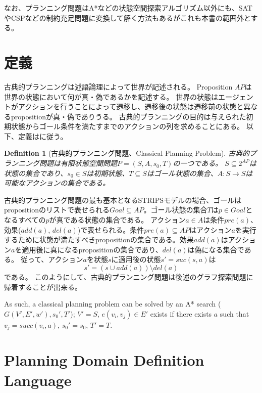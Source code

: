 \documentclass[b5paper]{report}
\newtheorem{definition}{Definition}
\begin{document}
なお、プランニング問題はA*などの状態空間探索アルゴリズム以外にも、SATやCSPなどの制約充足問題に変換して解く方法もあるがこれも本書の範囲外とする\cite{kautz:92}。

\section{定義}
\label{sec:planning-definition}


古典的プランニングは述語論理によって世界が記述される\cite{fikes:71}。
Proposition $AP$は世界の状態において何が真・偽であるかを記述する。
世界の状態はエージェントがアクションを行うことによって遷移し、遷移後の状態は遷移前の状態と異なるpropositionが真・偽でありうる。
古典的プランニングの目的は与えられた初期状態からゴール条件を満たすまでのアクションの列を求めることにある。
以下、定義は\cite{edelkamp:2010:hst:1875144}に従う。

\begin{definition}[古典的プランニング問題、Classical Planning Problem]
古典的プランニング問題は有限状態空間問題$P = (S,A,s_0,T)$の一つである。
$S \subseteq 2^{AP}$は状態の集合であり、$s_0 \in S$は初期状態、$T \subseteq S$はゴール状態の集合、$A: S \rightarrow S$は可能なアクションの集合である。
\end{definition}

古典的プランニング問題の最も基本となるSTRIPSモデル\cite{fikes:71}の場合、ゴールはpropositionのリストで表せられる$Goal \subseteq AP$。ゴール状態の集合$T$は$p \in Goal$となるすべての$p$が真である状態の集合である。
アクション$a \in A$は条件$pre(a)$、効果($add(a)$, $del(a)$)で表せられる。条件$pre(a) \subseteq AP$はアクション$a$を実行するために状態が満たすべきpropositionの集合である。効果$add(a)$はアクション$a$を適用後に真になるpropositionの集合であり、$del(a)$は偽になる集合である。
従って、アクション$a$を状態$s$に適用後の状態$s' = suc(s,a)$は
\begin{equation}
	s' = (s \cup add(a)) \setminus del(a)
\end{equation}
である。
このようにして、古典的プランニング問題は後述のグラフ探索問題に帰着することが出来る。

As such, a classical planning problem can be solved by an A* search ($G(V', E', w'), s_0', T'$); $V' = S$, $e(v_i, v_j) \in E'$ exists if there exists $a$ such that $v_j = succ(v_i, a)$, $s_0' = s_0$, $T' = T$.

\section{Planning Domain Definition Language}
\label{sec:pddl}
\end{document}
